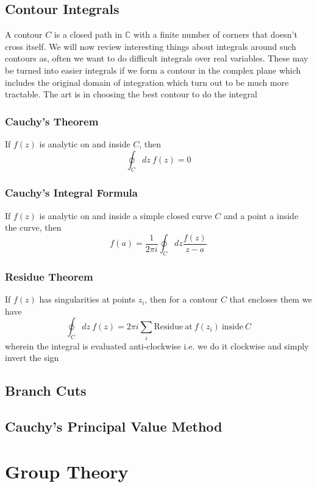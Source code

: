 \subsection{Contour Integrals}
A contour $C$ is a closed path in $\mathbb{C}$ with a finite number of corners that doesn't cross itself. We will now review interesting things about integrals around such contours as, often we want to do difficult integrals over real variables. These may
be turned into easier integrals if we form a contour in the complex plane
which includes the original domain of integration which turn out to be much more tractable. The art is in choosing the best contour to do the integral
\subsubsection{Cauchy's Theorem}
If $f(z)$ is analytic on and inside $C$, then
\begin{equation}
    \oint_{C} dz \ f(z) = 0
\end{equation}
\subsubsection{Cauchy's Integral Formula}
If $f(z)$ is analytic on and inside a simple closed curve $C$ and a point a inside the curve, then 
\begin{equation}
    f(a) = \frac{1}{2 \pi i} \oint_{C} dz \frac{f(z)}{z-a}
\end{equation}
\subsubsection{Residue Theorem}
If $f(z)$ has singularities at points $z_{i}$, then for a contour $C$ that encloses them we have
\begin{equation}
    \oint_{C}dz \ f(z) = 2 \pi i \sum_{i} \text{Residue} \ \text{at} \ f(z_{i}) \ \text{inside} \ C
\end{equation}
wherein the integral is evaluated anti-clockwise i.e. we do it clockwise and simply invert the sign
\subsection{Branch Cuts}

\subsection{Cauchy's Principal Value Method}

\section{Group Theory}
\label{appendix_d}
